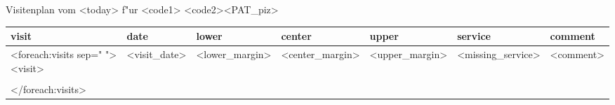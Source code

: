 \documentclass{scrreprt}
\begin{document}
\noindent Visitenplan {\it <Voller Titel>} vom <today> f"ur <code1> <code2><PAT_piz> \\

\begin{tabular}{lllllll}
visit &  date&  lower  & center & upper & service& comment \tabularnewline
\hline
 <foreach:visits sep=" ">
<visit> &<visit_date>& <lower_margin>  &<center_margin>   &<upper_margin> & <missing_service> & <comment>\\
\tabularnewline
</foreach:visits>
\hline
\end{tabular}
\end{document}
